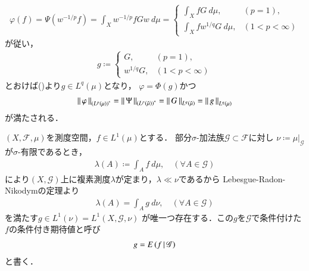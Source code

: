 \begin{prf}
\begin{description}
				\begin{align}
					\varphi(f) = \Psi\left( w^{-1/p} f \right)
					= \int_X w^{-1/p} f G w\ d\mu
					= \begin{cases}
						\displaystyle\int_X f G\ d\mu, & (p = 1), \\
						\displaystyle\int_X f w^{1/q} G\ d\mu, & (1 < p < \infty)
					\end{cases}
				\end{align}
				が従い，
				\begin{align}
					g \coloneqq
					\begin{cases}
						G, & (p = 1), \\
						w^{1/q} G, & (1 < p < \infty)
					\end{cases}
				\end{align}
				とおけば()より$g \in L^q(\mu)$となり，
				$\varphi = \Phi(g)$かつ
				\begin{align}
					\left\|\, \varphi\, \right\|_{\left( L^p(\mu) \right)^*} = \left\|\, \Psi\, \right\|_{\left( L^p(\tilde{\mu}) \right)^*}
					= \left\|\, G\, \right\|_{L^q(\tilde{\mu})}
					= \left\|\, g\, \right\|_{L^q(\mu)}
				\end{align}
				が満たされる．
				\QED
		\end{description}
	\end{prf}
	
	\begin{screen}
		\begin{dfn}[条件付き期待値]
			$(X,\mathscr{F},\mu)$を測度空間，$f \in L^1(\mu)$とする．
			部分$\sigma$-加法族$\mathscr{G} \subset \mathscr{F}$に対し
			$\nu \coloneqq \left. \mu \right|_{\mathscr{G}}$が$\sigma$-有限であるとき，
			\begin{align}
				\lambda(A) \coloneqq \int_A f\ d\mu,
				\quad (\forall A \in \mathscr{G})
			\end{align}
			により$(X,\mathscr{G})$上に複素測度$\lambda$が定まり，$\lambda \ll \nu$であるから
			Lebesgue-Radon-Nikodymの定理より
			\begin{align}
				\lambda(A) = \int_A g\ d\nu,
				\quad (\forall A \in \mathscr{G})
			\end{align}
			を満たす$g \in L^1(\nu) = L^1\left(X,\mathscr{G},\nu\right)$
			が唯一つ存在する．この$g$を$\mathscr{G}$で条件付けた$f$の条件付き期待値と呼び
			\begin{align}
				g = E\left( f \, \middle|\, \mathscr{G} \right)
			\end{align}
			と書く．
		\end{dfn}
	\end{screen}
	
